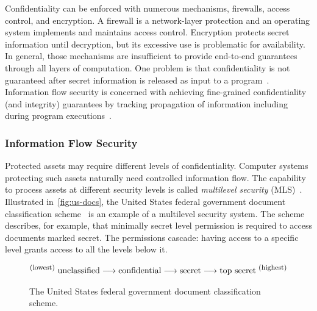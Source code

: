Confidentiality can be enforced with numerous mechanisms, \eg firewalls, access control, and encryption.
A firewall is a network-layer protection and an operating system implements and maintains access control.
Encryption protects secret information until decryption, but its excessive use is problematic for availability.
In general, those mechanisms are insufficient to provide end-to-end guarantees through all layers of computation.
One problem is that confidentiality is not guaranteed after secret information is released as input to a program~\cite{zdancewic2004}.
Information flow security is concerned with achieving fine-grained confidentiality (and integrity) guarantees by tracking propagation of information including during program executions~\cite{hedin2012,eggert2014}.

\subsubsection{Information Flow Security}\label{if-security}

Protected assets may require different levels of confidentiality.
Computer systems protecting such assets naturally need controlled information flow.
The capability to process assets at different security levels is called {\emph{multilevel security} (MLS)}~\cite{bossi2005}.
Illustrated in~\autoref{fig:us-docs}, the United States federal government document classification scheme~\cite{wiki_us_docs} is an example of a multilevel security system.
The scheme describes, for example, that minimally secret level permission is required to access documents marked secret.
The permissions cascade: having access to a specific level grants access to all the levels below it.

\begin{figure}[t]
\begin{align*}
^\text{\footnotesize{(lowest) }}
\text{unclassified}
\hfill\longrightarrow\hfill\text{confidential}
\hfill\longrightarrow\hfill\text{secret}
\hfill\longrightarrow\hfill\text{top secret}^\text{\footnotesize{ (highest)}}
\end{align*}
\caption[Document classification system.]
{The United States federal government document classification scheme.}
\label{fig:us-docs}
\end{figure}

